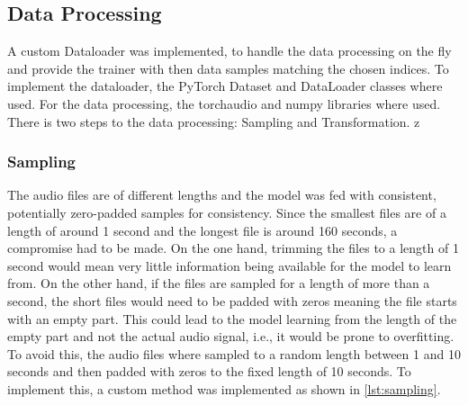 

\subsection{Data Processing}%
A custom Dataloader was implemented, to handle the data processing on the fly
and provide the trainer with then data samples matching the chosen indices.
To implement the dataloader, the PyTorch Dataset and DataLoader classes where used.
For the data processing, the torchaudio and numpy libraries where used.
There is two steps to the data processing: Sampling and Transformation.
z
\subsubsection{Sampling}%
The audio files are of different lengths and the model was fed with consistent, potentially zero-padded samples for consistency.
Since the smallest files are of a length of around 1 second and the longest file is around
160 seconds, a compromise had to be made. On the one hand, trimming the files to a length of 1 second
would mean very little information being available for the model to learn from. On the other
hand, if the files are sampled for a length of more than a second, the short files would need
to be padded with zeros meaning the file starts with an empty part. This could lead
to the model learning from the length of the empty part and not the actual audio signal, i.e., it would be prone to overfitting.
To avoid this, the audio files where sampled to a random length between 1 and 10 seconds and
then padded with zeros to the fixed length of 10 seconds. To implement this, a custom method
was implemented as shown in \autoref{lst:sampling}.




